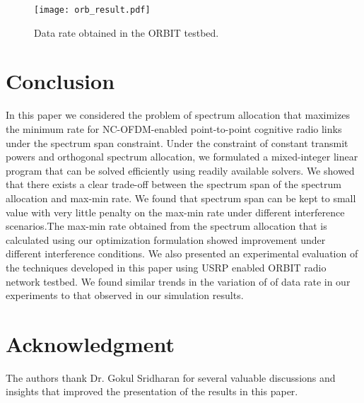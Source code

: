\documentclass[conference]{IEEEtran}
\begin{document}
\begin{figure}[!t]
  \centering
    \texttt{[image: orb\_result.pdf]}
    \caption{Data rate obtained in the ORBIT testbed.}
  \label{fig:orbresult}
\end{figure}


\section{Conclusion} 
\label{sec:conclude}
In this paper we considered the problem of spectrum allocation  that maximizes the minimum rate for NC-OFDM-enabled  point-to-point cognitive radio links under the spectrum span constraint. Under the constraint of constant transmit powers and orthogonal spectrum allocation, we formulated a mixed-integer linear program that can be solved efficiently using readily available solvers.  We showed that there exists a clear trade-off between the spectrum span of the spectrum allocation and max-min rate. We found that spectrum span can be kept to small value with very little penalty on the max-min rate under different interference scenarios.The max-min rate obtained from the spectrum allocation that is calculated using our optimization formulation showed improvement under different interference conditions. We also presented an experimental evaluation of the techniques developed in this paper using  USRP enabled ORBIT radio network testbed.  We found similar trends in the variation of  of data rate in our experiments to that observed in our simulation results.

\section*{Acknowledgment}
The authors thank Dr. Gokul Sridharan for several valuable discussions and insights that improved the presentation of the results in this paper.




 
\end{document}
